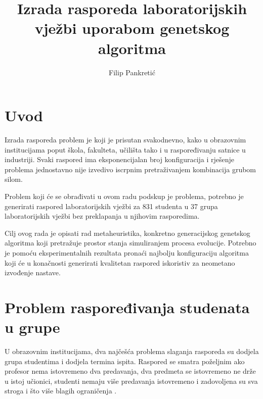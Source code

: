 \documentclass[times, utf8, zavrsni]{fer}
\begin{document}

\title{Izrada rasporeda laboratorijskih vježbi uporabom genetskog algoritma}

\author{Filip Pankretić}

\maketitle

\izvornik


\tableofcontents
\listoffigures

\chapter{Uvod}

Izrada rasporeda problem je koji je prisutan svakodnevno, kako u obrazovnim institucijama poput škola, fakulteta, učilišta tako i u raspoređivanju satnice u industriji. Svaki raspored ima eksponencijalan broj konfiguracija i rješenje problema jednostavno nije izvedivo iscrpnim pretraživanjem kombinacija grubom silom.

Problem koji će se obrađivati u ovom radu podskup je problema, potrebno je generirati raspored laboratorijskih vježbi za 831 studenta u 37 grupa laboratorijskih vježbi bez preklapanja u njihovim rasporedima.

Cilj ovog rada je opisati rad metaheuristika, konkretno generacijskog genetskog algoritma koji pretražuje prostor stanja simuliranjem procesa evolucije. Potrebno je pomoću eksperimentalnih rezultata pronaći najbolju konfiguraciju algoritma koji će u konačnosti generirati kvalitetan raspored iskoristiv za neometano izvođenje nastave.

\chapter{Problem raspoređivanja studenata u grupe}

U obrazovnim institucijama, dva najčešća problema slaganja rasporeda su dodjela grupa studentima i dodjela termina ispita. Raspored se smatra poželjnim ako profesor nema istovremeno dva predavanja, dva predmeta se istovremeno ne drže u istoj učionici, studenti nemaju više predavanja istovremeno i zadovoljena su sva stroga i što više blagih ograničenja \citep{ganguli2017study}.
\end{document}
